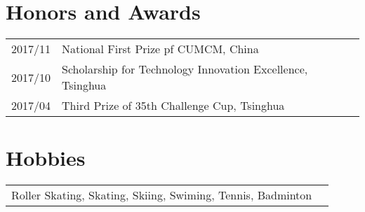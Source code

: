\documentclass[a4paper,10pt]{article}
\begin{document}
\section{Honors and Awards}
\begin{tabular}{rl}
\textsc{2017/11} & National First Prize pf CUMCM, China                       \\
\textsc{2017/10} & Scholarship for Technology Innovation Excellence, Tsinghua \\
\textsc{2017/04} & Third Prize of 35th Challenge Cup, Tsinghua                \\
\end{tabular}

\section{Hobbies}
\begin{tabular}{rl}
Roller Skating, Skating, Skiing, Swiming, Tennis, Badminton
\end{tabular}
\end{document}
